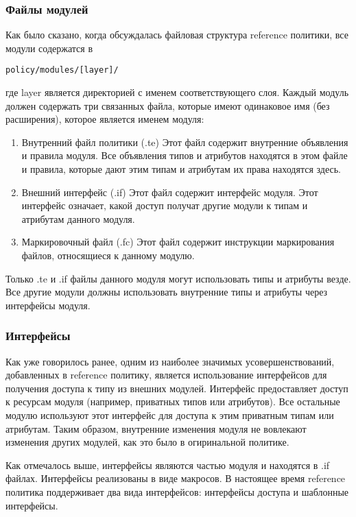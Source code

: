 \documentclass{./../class/UIR}
\begin{document}
	\subsubsection{Файлы модулей}
	
	Как было сказано, когда обсуждалась файловая структура reference политики, все
	модули содержатся в \begin{verbatim}policy/modules/[layer]/\end{verbatim} где
	layer является директорией с именем соответствующего слоя. Каждый модуль должен
	содержать три связанных файла, которые имеют одинаковое имя (без расширения),
	которое является именем модуля:
 
\begin{enumerate}
  \item Внутренний файл политики (.te) Этот файл содержит внутренние объявления
  и правила модуля. Все объявления типов и атрибутов находятся в этом файле и
  правила, которые дают этим типам и атрибутам их права находятся здесь.
  \item Внешний интерфейс (.if) Этот файл содержит интерфейс модуля. Этот
  интерфейс означает, какой доступ получат другие модули к типам и атрибутам
  данного модуля.
  \item Маркировочный файл (.fc) Этот файл содержит инструкции маркирования
  файлов, относящиеся к данному модулю.
\end{enumerate}

Только .te и .if файлы данного модуля могут использовать типы и атрибуты везде.
Все другие модули должны использовать внутренние типы и атрибуты через
интерфейсы модуля.

\subsubsection{Интерфейсы}
	Как уже говорилось ранее, одним из наиболее значимых усовершенствований, 
	добавленных в reference политику, является использование интерфейсов для
	получения доступа к типу из внешних модулей. Интерфейс предоставляет доступ к
	ресурсам модуля (например, приватных типов или атрибутов). Все остальные
	модулю используют этот интерфейс для доступа к этим приватным типам или
	атрибутам. Таким образом, внутренние изменения модуля не вовлекают изменения
	других модулей, как это было в огиринальной политике.
	
	Как отмечалось выше, интерфейсы являются частью модуля и находятся в .if
	файлах. Интерфейсы реализованы в виде макросов. В настоящее время reference
	политика поддерживает два вида интерфейсов: интерфейсы доступа и шаблонные
	интерфейсы.
\end{document}
